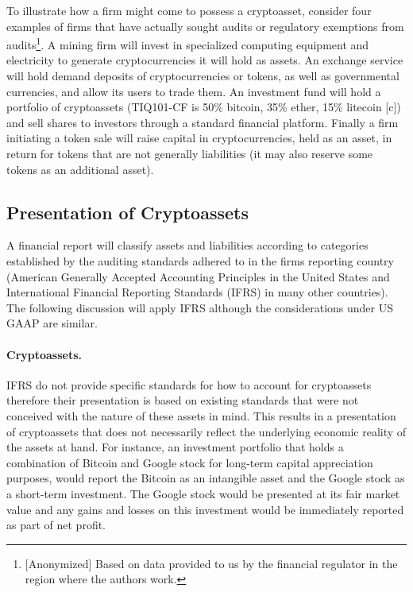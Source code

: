 To illustrate how a firm might come to possess a cryptoasset, consider four examples of firms that have actually sought audits or regulatory exemptions from audits\footnote{[Anonymized] Based on data provided to us by the financial regulator in the region where the authors work.}. A mining firm will invest in specialized computing equipment and electricity to generate cryptocurrencies it will hold as assets. An exchange service will hold demand deposits of cryptocurrencies or tokens, as well as governmental currencies, and allow its users to trade them. An investment fund will hold a portfolio of cryptoassets (\eg TIQ101-CF is 50\% bitcoin, 35\% ether, 15\% litecoin [c]) and sell shares to investors through a standard financial platform. Finally a firm initiating a token sale will raise capital in cryptocurrencies, held as an asset, in return for tokens that are not generally liabilities (it may also reserve some tokens as an additional asset).



\subsection{Presentation of Cryptoassets}
A financial report will classify assets and liabilities according to categories established by the auditing standards adhered to in the firm\textquotesingle s reporting country (American Generally Accepted Accounting Principles in the United States and International Financial Reporting Standards (IFRS) in many other countries). The following discussion will apply IFRS although the considerations under US GAAP are similar.



\paragraph{Cryptoassets.} IFRS do not provide specific standards for how to account for cryptoassets therefore their presentation is based on existing standards that were not conceived with the nature of these assets in mind. This results in a presentation of cryptoassets that does not necessarily reflect the underlying economic reality of the assets at hand. For instance, an investment portfolio that holds a combination of Bitcoin and Google stock for long-term capital appreciation purposes, would report the Bitcoin as an intangible asset and the Google stock as a short-term investment. The Google stock would be presented at its fair market value and any gains and losses on this investment would be immediately reported as part of net profit. 

